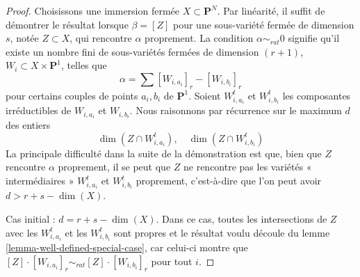 \begin{proof}
Choisissons une immersion fermée $X \subset \mathbf{P}^N$.
Par linéarité, il suffit de démontrer le résultat lorsque $\beta = [Z]$ pour une
sous-variété fermée de dimension $s$, notée $Z \subset X$, qui rencontre $\alpha$
proprement. La condition $\alpha \sim_{rat} 0$ signifie qu'il
existe un nombre fini de sous-variétés fermées de dimension $(r + 1)$,
$W_i \subset X \times \mathbf{P}^1$, telles que
$$
\alpha = \sum [W_{i, a_i}]_r - [W_{i, b_i}]_r
$$
pour certains couples de points $a_i, b_i$ de $\mathbf{P}^1$.
Soient $W_{i, a_i}^t$ et $W_{i, b_i}^t$ les composantes irréductibles
de $W_{i, a_i}$ et $W_{i, b_i}$.
Nous raisonnons par récurrence sur le maximum $d$ des entiers
$$
\dim(Z \cap W_{i, a_i}^t),\quad \dim(Z \cap W_{i, b_i}^t)
$$
La principale difficulté dans la suite de la démonstration est que, bien que $Z$
rencontre $\alpha$ proprement, il se peut que $Z$ ne rencontre pas les
variétés « intermédiaires » $W_{i, a_i}^t$
et $W_{i, b_i}^t$ proprement, c'est-à-dire que l'on peut avoir $d >  r + s - \dim(X)$.

\medskip\noindent
Cas initial : $d = r + s - \dim(X)$. Dans ce cas, toutes les intersections de
$Z$ avec les $W_{i, a_i}^t$ et les $W_{i, b_i}^t$ sont propres et le
résultat voulu découle du lemme \ref{lemma-well-defined-special-case},
car celui-ci montre que
$[Z] \cdot [W_{i, a_i}]_r \sim_{rat} [Z] \cdot [W_{i, b_i}]_r$ pour
tout $i$.


\end{proof}
